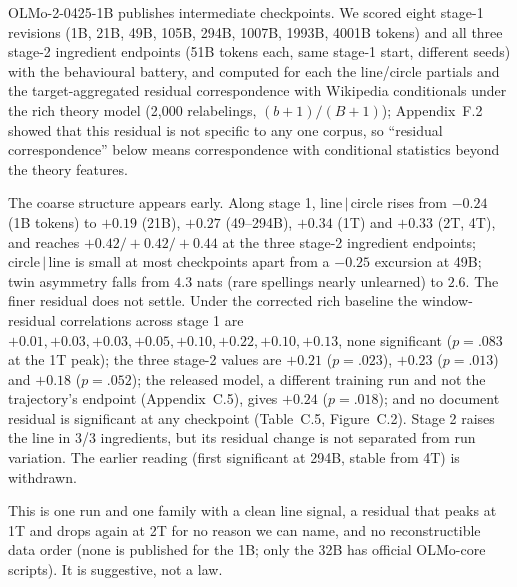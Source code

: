 \documentclass[11pt]{article}
\newcommand{\lc}{line$\,|\,$circle}
\newcommand{\cl}{circle$\,|\,$line}
\begin{document}
OLMo-2-0425-1B publishes intermediate checkpoints. We scored eight stage-1 revisions (1B, 21B, 49B, 105B, 294B, 1007B, 1993B, 4001B tokens) and all three stage-2 ingredient endpoints (51B tokens each, same stage-1 start, different seeds) with the behavioural battery, and computed for each the line/circle partials and the target-aggregated residual correspondence with Wikipedia conditionals under the rich theory model (2,000 relabelings, $(b+1)/(B+1)$); Appendix~F.2 showed that this residual is not specific to any one corpus, so ``residual correspondence'' below means correspondence with conditional statistics beyond the theory features.

\begin{resultbox}
The coarse structure appears early. Along stage 1, \lc{} rises from $-0.24$ (1B tokens) to $+0.19$ (21B), $+0.27$ (49--294B), $+0.34$ (1T) and $+0.33$ (2T, 4T), and reaches $+0.42/{+}0.42/{+}0.44$ at the three stage-2 ingredient endpoints; \cl{} is small at most checkpoints apart from a $-0.25$ excursion at 49B; twin asymmetry falls from $4.3$ nats (rare spellings nearly unlearned) to $2.6$. The finer residual does not settle. Under the corrected rich baseline the window-residual correlations across stage 1 are $+0.01,+0.03,+0.03,+0.05,+0.10,+0.22,+0.10,+0.13$, none significant ($p=.083$ at the 1T peak); the three stage-2 values are $+0.21$ ($p=.023$), $+0.23$ ($p=.013$) and $+0.18$ ($p=.052$); the released model, a different training run and not the trajectory's endpoint (Appendix~C.5), gives $+0.24$ ($p=.018$); and no document residual is significant at any checkpoint (Table~C.5, Figure~C.2). Stage 2 raises the line in 3/3 ingredients, but its residual change is not separated from run variation. The earlier reading (first significant at 294B, stable from 4T) is withdrawn.
\end{resultbox}

This is one run and one family with a clean line signal, a residual that peaks at 1T and drops again at 2T for no reason we can name, and no reconstructible data order (none is published for the 1B; only the 32B has official OLMo-core scripts). It is suggestive, not a law.

\end{document}
